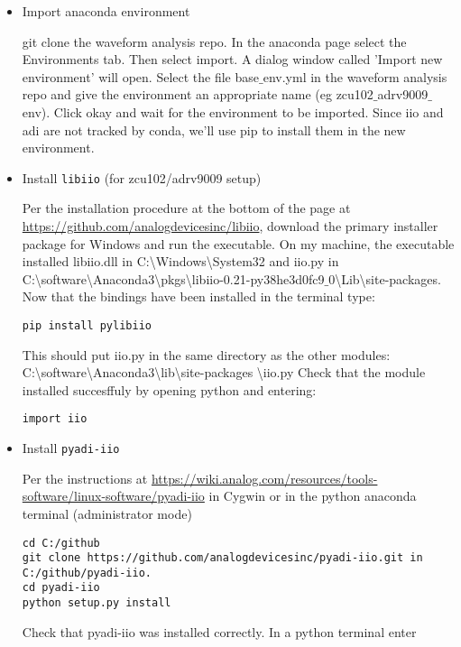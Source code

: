 \documentclass[10pt,twoside]{article}
\begin{document}
\begin{itemize}
\item Import anaconda environment

git clone the waveform analysis repo.  In the anaconda page select the Environments tab.  Then select import.  A dialog window called 'Import new environment' will open.  Select the file base$\_$env.yml in the waveform analysis repo and give the environment an appropriate name (eg zcu102$\_$adrv9009$\_$env).  Click okay and wait for the environment to be imported.  Since iio and adi are not tracked by conda, we'll use pip to install them in the new environment.

\item Install \verb+libiio+ (for zcu102/adrv9009 setup)

Per the installation procedure at the bottom of the page at \href{https://github.com/analogdevicesinc/libiio}{https://github.com/analogdevicesinc/libiio}, 
download the primary installer package for Windows and run the executable.  On my machine, the executable installed libiio.dll in C:\textbackslash Windows\textbackslash System32 and iio.py in C:\textbackslash software\textbackslash Anaconda3\textbackslash pkgs\textbackslash libiio-0.21-py38he3d0fc9$\_$0\textbackslash Lib\textbackslash site-packages.  Now that the bindings have been installed in the terminal type:
\begin{verbatim}
pip install pylibiio
\end{verbatim}
This should put iio.py in the same directory as the other modules:  C:\textbackslash software\textbackslash Anaconda3\textbackslash lib\textbackslash site-packages \textbackslash iio.py
Check that the module installed succesffuly by opening python and entering:
\begin{verbatim}
import iio
\end{verbatim}

\item Install \verb+pyadi-iio+

Per the instructions at \href{https://wiki.analog.com/resources/tools-software/linux-software/pyadi-iio}{https://wiki.analog.com/resources/tools-software/linux-software/pyadi-iio} in Cygwin or in the python anaconda terminal (administrator mode)

\begin{verbatim}
cd C:/github
git clone https://github.com/analogdevicesinc/pyadi-iio.git in C:/github/pyadi-iio.
cd pyadi-iio
python setup.py install
\end{verbatim}

Check that pyadi-iio was installed correctly.  In a python terminal enter


\end{itemize}
\end{document}
